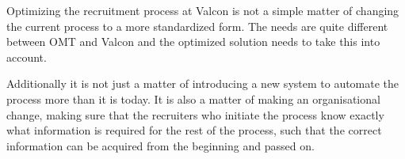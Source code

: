 Optimizing the recruitment process at Valcon is not a simple matter of changing the current process to a more standardized form.
The needs are quite different between OMT and Valcon and the optimized solution needs to take this into account.

Additionally it is not just a matter of introducing a new system to automate the process more than it is today. It is also a matter of making an organisational change, making sure that the recruiters who initiate the process know exactly what information is required for the rest of the process, such that the correct information can be acquired from the beginning and passed on.